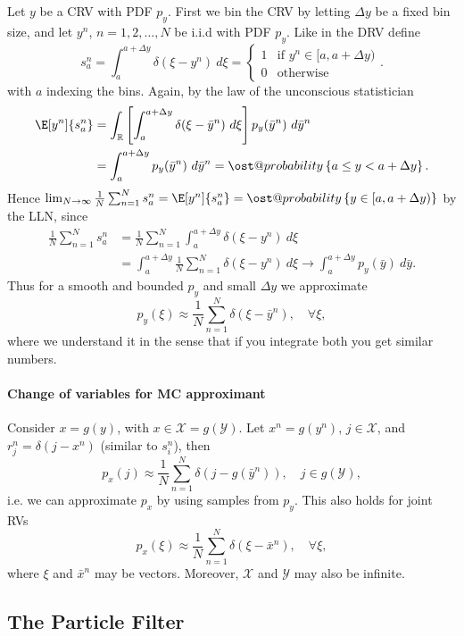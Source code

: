 \documentclass[]{hsrzf}
\makeatletter
\renewcommand*{\Pr}[2][]{\ost@probability_{#1}\left\{#2\right\}}
\theoremstyle{plain}
\theoremstyle{definition}
\theoremstyle{remark}
\makeatother
\begin{document}
Let $y$ be a CRV with PDF $p_y$. First we bin the CRV by letting $\Delta y$ be
a fixed bin size, and let $y^n$, $n=1,2,\ldots,N$ be i.i.d with PDF $p_y$.
Like in the DRV define
\[
  s^n_a = \int_a^{a+\Delta y} \delta(\xi - y^n) ~d\xi =
  \begin{cases}
    1 & \text{if } y^n \in [a, a+\Delta y) \\
    0 & \text{otherwise}
  \end{cases}.
\]
with $a$ indexing the bins. Again, by the law of the unconscious statistician
\begin{align*}
  \E[y^n]{s^n_a} &= \int_\mathbb{R} \left[
      \int_a^{a+\Delta y} \delta(\xi - \bar{y}^n) ~d\xi
    \right] p_y(\bar{y}^n) ~d\bar{y}^n \\
  &= \int_a^{a+\Delta y} p_y(\bar{y}^n) ~d\bar{y}^n
    = \Pr{a \leq y < a + \Delta y}.
\end{align*}
Hence $\lim_{N\to\infty} \frac{1}{N} \sum_{n=1}^N s^n_a = \E[y^n]{s_a^n} =
\Pr{y \in [a,a+\Delta y)}$ by the LLN, since
\begin{align*}
  \frac{1}{N} \sum_{n=1}^N s_a^n
    &= \frac{1}{N} \sum_{n=1}^N \int_a^{a + \Delta y}
      \delta(\xi - y^n) ~d\xi \\
    &= \int_a^{a + \Delta y} \frac{1}{N} \sum_{n=1}^N
      \delta(\xi - y^n) ~d\xi \to \int_a^{a+\Delta y} p_y(\bar{y}) ~d\bar{y}.
\end{align*}
Thus for a smooth and bounded $p_y$ and small $\Delta y$ we approximate
\[
  p_y(\xi) \approx \frac{1}{N} \sum_{n=1}^N \delta(\xi - \bar{y}^n), 
  \quad \forall \xi,
\]
where we understand it in the sense that if you integrate both you get similar
numbers.

\paragraph{Change of variables for MC approximant}

Consider $x = g(y)$, with $x \in \mathcal{X} = g(\mathcal{Y})$. Let $x^n =
g(y^n)$, $j \in \mathcal{X}$, and $r^n_j = \delta(j - x^n)$ (similar to
$s_i^n$), then
\[
  p_x(j) \approx \frac{1}{N} \sum_{n=1}^N \delta(j - g(\bar{y}^n)),
  \quad j \in g(\mathcal{Y}),
\]
i.e. we can approximate $p_x$ by using samples from $p_y$. This also holds for
joint RVs
\[
  p_x(\xi) \approx \frac{1}{N} \sum_{n=1}^N \delta(\xi - \bar{x}^n), 
  \quad \forall \xi,
\]
where $\xi$ and $\bar{x}^n$ may be vectors. Moreover, $\mathcal{X}$ and
$\mathcal{Y}$ may also be infinite.

\subsection{The Particle Filter}
\end{document}
